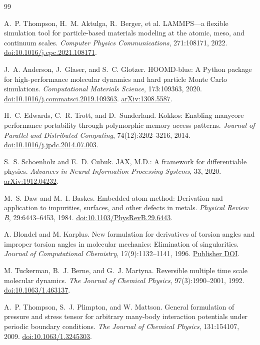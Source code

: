 \documentclass[11pt,a4paper]{article}
\theoremstyle{definition}
\begin{document}
\begin{thebibliography}{99}
\small

A.~P. Thompson, H.~M. Aktulga, R.~Berger, et al.
LAMMPS---a flexible simulation tool for particle-based materials modeling at the atomic, meso,
and continuum scales.
\emph{Computer Physics Communications}, 271:108171, 2022.
\href{https://doi.org/10.1016/j.cpc.2021.108171}{doi:10.1016/j.cpc.2021.108171}.

J.~A. Anderson, J.~Glaser, and S.~C. Glotzer.
HOOMD-blue: A Python package for high-performance molecular dynamics and hard particle Monte
Carlo simulations.
\emph{Computational Materials Science}, 173:109363, 2020.
\href{https://doi.org/10.1016/j.commatsci.2019.109363}{doi:10.1016/j.commatsci.2019.109363}.
\href{https://arxiv.org/abs/1308.5587}{arXiv:1308.5587}.

H.~C. Edwards, C.~R. Trott, and D.~Sunderland.
Kokkos: Enabling manycore performance portability through polymorphic memory access patterns.
\emph{Journal of Parallel and Distributed Computing}, 74(12):3202--3216, 2014.
\href{https://doi.org/10.1016/j.jpdc.2014.07.003}{doi:10.1016/j.jpdc.2014.07.003}.

S.~S. Schoenholz and E.~D. Cubuk.
JAX, M.D.: A framework for differentiable physics.
\emph{Advances in Neural Information Processing Systems}, 33, 2020.
\href{https://arxiv.org/abs/1912.04232}{arXiv:1912.04232}.

M.~S. Daw and M.~I. Baskes.
Embedded-atom method: Derivation and application to impurities, surfaces, and other defects in metals.
\emph{Physical Review B}, 29:6443--6453, 1984.
\href{https://doi.org/10.1103/PhysRevB.29.6443}{doi:10.1103/PhysRevB.29.6443}.

A. Blondel and M. Karplus.
New formulation for derivatives of torsion angles and improper torsion angles in molecular
mechanics: Elimination of singularities.
\emph{Journal of Computational Chemistry}, 17(9):1132--1141, 1996.
\href{https://doi.org/10.1002/(SICI)1096-987X(19960715)17:9<1132::AID-JCC5>3.0.CO;2-T}{Publisher DOI}.

M. Tuckerman, B.~J. Berne, and G.~J. Martyna.
Reversible multiple time scale molecular dynamics.
\emph{The Journal of Chemical Physics}, 97(3):1990--2001, 1992.
\href{https://doi.org/10.1063/1.463137}{doi:10.1063/1.463137}.

A.~P. Thompson, S.~J. Plimpton, and W. Mattson.
General formulation of pressure and stress tensor for arbitrary many-body interaction
potentials under periodic boundary conditions.
\emph{The Journal of Chemical Physics}, 131:154107, 2009.
\href{https://doi.org/10.1063/1.3245303}{doi:10.1063/1.3245303}.


\end{thebibliography}
\end{document}
